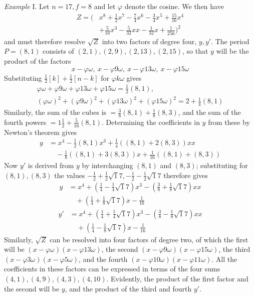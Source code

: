 \textit{Example} I. Let \(n=17,\allowbreak f=8\) and let \(\varphi\) denote the cosine. We then have \[\begin{aligned}Z=\bigl(&x^8+\tfrac12x^7-\tfrac74x^6-\tfrac34x^5+\tfrac{15}{16}x^4\\&+\tfrac5{16}x^3-\tfrac5{32}xx-\tfrac1{32}x+\tfrac1{256}\bigr)^2\end{aligned}\] and must therefore resolve \(\surd Z\) into two factors of degree four, \(y,\allowbreak y'\). The period \(P=(8,1)\) consists of \((2,1),\allowbreak (2,9),\allowbreak (2,13),\allowbreak (2,15)\), so that \(y\) will be the product of the factors \[x-\varphi\omega,\ x-\varphi9\omega,\ x-\varphi13\omega,\ x-\varphi15\omega\] Substituting \(\tfrac12[k]+\tfrac12[n-k]\) for \(\varphi k\omega\) gives \[\begin{gathered}\varphi\omega+\varphi9\omega+\varphi13\omega+\varphi15\omega=\tfrac12(8,1),\\(\varphi\omega)^2+(\varphi9\omega)^2+(\varphi13\omega)^2+(\varphi15\omega)^2=2+\tfrac14(8,1)\end{gathered}\] Similarly, the sum of the cubes is \(=\tfrac38(8,1)+\tfrac18(8,3)\), and the sum of the fourth powers \(=1\tfrac12+\tfrac5{16}(8,1)\). Determining the coefficients in \(y\) from these by Newton's theorem gives \[\begin{aligned}y&=x^4-\tfrac12(8,1)x^3+\tfrac14((8,1)+2(8,3))xx\\&\quad-\tfrac18((8,1)+3(8,3))x+\tfrac1{16}((8,1)+(8,3))\end{aligned}\] Now \(y'\) is derived from \(y\) by interchanging \((8,1)\) and \((8,3)\); substituting for \((8,1),\allowbreak (8,3)\) the values \(-\tfrac12+\tfrac12\surd17,\allowbreak -\tfrac12-\tfrac12\surd17\) therefore gives \[\begin{aligned}y&=x^4+(\tfrac14-\tfrac14\surd17)x^3-(\tfrac38+\tfrac18\surd17)xx\\&\quad+(\tfrac14+\tfrac18\surd17)x-\tfrac1{16}\end{aligned}\] \[\begin{aligned}y'&=x^4+(\tfrac14+\tfrac14\surd17)x^3-(\tfrac38-\tfrac18\surd17)xx\\&\quad+(\tfrac14-\tfrac18\surd17)x-\tfrac1{16}\end{aligned}\] Similarly, \(\surd Z\) can be resolved into four factors of degree two, of which the first will be \((x-\varphi\omega)(x-\varphi13\omega)\), the second \((x-\varphi9\omega)(x-\varphi15\omega)\), the third \((x-\varphi3\omega)(x-\varphi5\omega)\), and the fourth \((x-\varphi10\omega)(x-\varphi11\omega)\). All the coefficients in these factors can be expressed in terms of the four sums \((4,1),\allowbreak (4,9),\allowbreak (4,3),\allowbreak (4,10)\). Evidently, the product of the first factor and the second will be \(y\), and the product of the third and fourth \(y'\).

